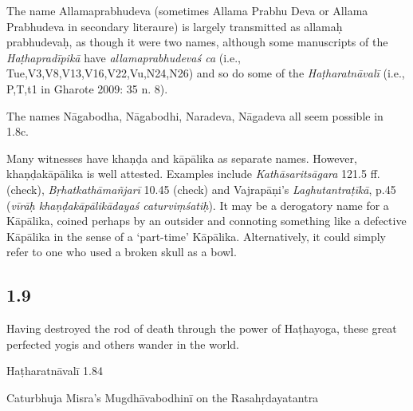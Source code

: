 \begin{ekdosis}
\begin{testimonia}[hp01_008]
\end{testimonia}

\begin{philcomm}[hp01_008]  
The name Allamaprabhudeva (sometimes Allama Prabhu Deva or Allama Prabhudeva in secondary literaure) is largely transmitted as allamaḥ prabhudevaḥ, as though it were two names, although some manuscripts of the \emph{Haṭhapradīpikā} have \emph{allamaprabhudevaś ca} (i.e., Tue,V3,V8,V13,V16,V22,Vu,N24,N26) and so do some of the \emph{Haṭharatnāvalī} (i.e., P,T,t1 in Gharote 2009: 35 n. 8).

The names Nāgabodha, Nāgabodhi, Naradeva, Nāgadeva all seem possible in 1.8c. 

Many witnesses have khaṇḍa and kāpālika as separate names. However, khaṇḍakāpālika is well attested. Examples include \emph{Kathāsaritsāgara} 121.5 ff. (check), \emph{Bṛhatkathāmañjarī} 10.45 (check) and Vajrapāṇi’s \emph{Laghutantraṭīkā}, p.45 (\emph{vīrāḥ khaṇḍakāpālikādayaś caturviṃśatiḥ}). It may be a derogatory name for a Kāpālika, coined perhaps by an outsider and connoting something like a defective Kāpālika in the sense of a ‘part-time’ Kāpālika. Alternatively, it could simply refer to one who used a broken skull as a bowl.
\end{philcomm}

\subsection*{1.9}
\begin{translation}[hp01_009]
Having destroyed the rod of death through the power of Haṭhayoga, these great perfected yogis and others wander in the world.
\end{translation}

\begin{testimonia}[hp01_009]
Haṭharatnāvalī 1.84

\begin{versinnote}
\end{versinnote}

Caturbhuja Misra's Mugdhāvabodhinī on the Rasahṛdayatantra

\begin{versinnote}
\end{versinnote}


\end{testimonia}
\end{ekdosis}
